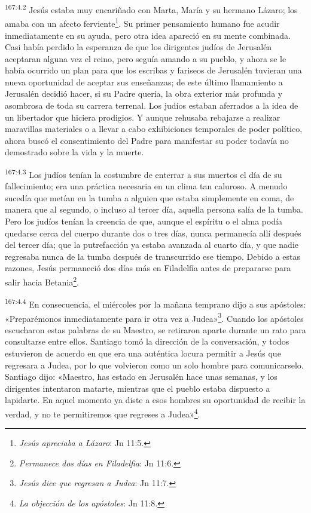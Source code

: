 \par 
\textsuperscript{167:4.2} Jesús estaba muy encariñado con Marta, María y su hermano Lázaro; los amaba con un afecto ferviente\footnote{\textit{Jesús apreciaba a Lázaro}: Jn 11:5.}. Su primer pensamiento humano fue acudir inmediatamente en su ayuda, pero otra idea apareció en su mente combinada. Casi había perdido la esperanza de que los dirigentes judíos de Jerusalén aceptaran alguna vez el reino, pero seguía amando a su pueblo, y ahora se le había ocurrido un plan para que los escribas y fariseos de Jerusalén tuvieran una nueva oportunidad de aceptar sus enseñanzas; de este último llamamiento a Jerusalén decidió hacer, si su Padre quería, la obra exterior más profunda y asombrosa de toda su carrera terrenal. Los judíos estaban aferrados a la idea de un libertador que hiciera prodigios. Y aunque rehusaba rebajarse a realizar maravillas materiales o a llevar a cabo exhibiciones temporales de poder político, ahora buscó el consentimiento del Padre para manifestar su poder todavía no demostrado sobre la vida y la muerte.

\par 
\textsuperscript{167:4.3} Los judíos tenían la costumbre de enterrar a sus muertos el día de su fallecimiento; era una práctica necesaria en un clima tan caluroso. A menudo sucedía que metían en la tumba a alguien que estaba simplemente en coma, de manera que al segundo, o incluso al tercer día, aquella persona salía de la tumba. Pero los judíos tenían la creencia de que, aunque el espíritu o el alma podía quedarse cerca del cuerpo durante dos o tres días, nunca permanecía allí después del tercer día; que la putrefacción ya estaba avanzada al cuarto día, y que nadie regresaba nunca de la tumba después de transcurrido ese tiempo. Debido a estas razones, Jesús permaneció dos días más en Filadelfia antes de prepararse para salir hacia Betania\footnote{\textit{Permanece dos días en Filadelfia}: Jn 11:6.}.

\par 
\textsuperscript{167:4.4} En consecuencia, el miércoles por la mañana temprano dijo a sus apóstoles: «Preparémonos inmediatamente para ir otra vez a Judea»\footnote{\textit{Jesús dice que regresan a Judea}: Jn 11:7.}. Cuando los apóstoles escucharon estas palabras de su Maestro, se retiraron aparte durante un rato para consultarse entre ellos. Santiago tomó la dirección de la conversación, y todos estuvieron de acuerdo en que era una auténtica locura permitir a Jesús que regresara a Judea, por lo que volvieron como un solo hombre para comunicarselo. Santiago dijo: «Maestro, has estado en Jerusalén hace unas semanas, y los dirigentes intentaron matarte, mientras que el pueblo estaba dispuesto a lapidarte. En aquel momento ya diste a esos hombres su oportunidad de recibir la verdad, y no te permitiremos que regreses a Judea»\footnote{\textit{La objección de los apóstoles}: Jn 11:8.}.

